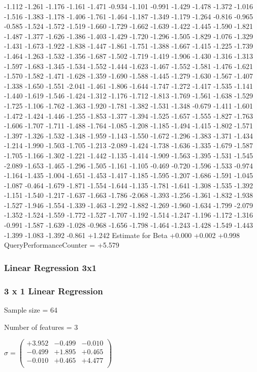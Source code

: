 \documentclass[9pt]{article}
\theoremstyle{plain}
\theoremstyle{definition}
\theoremstyle{remark}
\numberwithin{equation}{section}
\begin{document}
-1.112
-1.261
-1.176
-1.161
-1.471
-0.934
-1.101
-0.991
-1.429
-1.478
-1.372
-1.016
-1.516
-1.383
-1.178
-1.406
-1.761
-1.464
-1.187
-1.349
-1.179
-1.264
-0.816
-0.965
-0.585
-1.524
-1.572
-1.519
-1.660
-1.729
-1.662
-1.639
-1.422
-1.445
-1.590
-1.821
-1.487
-1.377
-1.626
-1.386
-1.403
-1.429
-1.720
-1.296
-1.505
-1.829
-1.076
-1.329
-1.431
-1.673
-1.922
-1.838
-1.447
-1.861
-1.751
-1.388
-1.667
-1.415
-1.225
-1.739
-1.464
-1.263
-1.532
-1.356
-1.687
-1.502
-1.719
-1.419
-1.906
-1.430
-1.316
-1.313
-1.597
-1.683
-1.345
-1.534
-1.552
-1.444
-1.623
-1.467
-1.552
-1.581
-1.476
-1.621
-1.570
-1.582
-1.471
-1.628
-1.359
-1.690
-1.588
-1.445
-1.279
-1.630
-1.567
-1.407
-1.338
-1.650
-1.551
-2.041
-1.461
-1.806
-1.644
-1.747
-1.272
-1.417
-1.535
-1.141
-1.440
-1.619
-1.546
-1.424
-1.312
-1.176
-1.712
-1.813
-1.769
-1.561
-1.638
-1.529
-1.725
-1.106
-1.762
-1.363
-1.920
-1.781
-1.382
-1.531
-1.348
-0.679
-1.411
-1.601
-1.472
-1.424
-1.446
-1.255
-1.853
-1.377
-1.394
-1.525
-1.657
-1.555
-1.827
-1.763
-1.606
-1.707
-1.711
-1.488
-1.764
-1.085
-1.208
-1.185
-1.494
-1.415
-1.802
-1.571
-1.397
-1.326
-1.532
-1.348
-1.959
-1.143
-1.550
-1.672
-1.296
-1.383
-1.371
-1.434
-1.214
-1.990
-1.503
-1.705
-1.213
-2.089
-1.424
-1.738
-1.636
-1.335
-1.679
-1.587
-1.705
-1.166
-1.302
-1.221
-1.442
-1.135
-1.414
-1.909
-1.563
-1.395
-1.531
-1.545
-2.089
-1.653
-1.465
-1.296
-1.505
-1.161
-1.105
-0.469
-0.720
-1.596
-1.533
-0.974
-1.164
-1.435
-1.004
-1.651
-1.453
-1.417
-1.185
-1.595
-1.207
-1.686
-1.591
-1.045
-1.087
-0.464
-1.679
-1.871
-1.554
-1.644
-1.135
-1.781
-1.641
-1.308
-1.535
-1.392
-1.151
-1.540
-1.217
-1.637
-1.663
-1.786
-2.068
-1.393
-1.256
-1.361
-1.832
-1.938
-1.527
-1.946
-1.554
-1.339
-1.463
-1.292
-1.882
-1.269
-1.960
-1.634
-1.799
-2.079
-1.352
-1.524
-1.559
-1.772
-1.527
-1.707
-1.192
-1.514
-1.247
-1.196
-1.172
-1.316
-0.991
-1.587
-1.639
-1.028
-0.968
-1.656
-1.798
-1.464
-1.243
-1.428
-1.549
-1.443
-1.399
-1.083
-1.392
-0.861
+1.242
Estimate for Beta
+0.000
+0.002
+0.998
QueryPerformanceCounter  =  +5.579
\subsubsection{Linear Regression 3x1}
\subsubsection{3 x 1 Linear Regression}
Sample size = 64

Number of features = 3

$\sigma = \left(
\begin{array}{
ccc}
+3.952 & -0.499 & -0.010 \\
-0.499 & +1.895 & +0.465 \\
-0.010 & +0.465 & +4.477 \\
\end{array}
\right)$ \newline 
\end{document}
